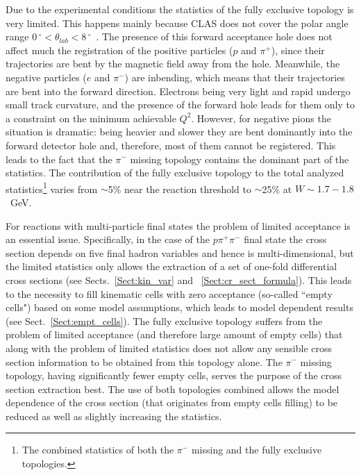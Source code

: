 Due to the experimental conditions the statistics of the fully exclusive topology is very limited. This happens mainly because CLAS does not cover the polar angle range $0\,^{\circ}\mathrm{} < \theta_{lab} < 8\,^{\circ}\mathrm{}$~\cite{Mecking:2003zu}. The presence of this forward acceptance
hole does not affect much the registration of the positive particles ($p$ and $\pi^{+}$), since their trajectories are bent by the magnetic field away from the hole. Meanwhile, the negative particles ($e$ and $\pi^{-}$) are inbending, which means that their trajectories are bent into the forward direction. Electrons being very light and rapid undergo small track curvature, and the presence of the forward hole leads for them only to a constraint on the minimum achievable $Q^2$. However, for negative pions the situation is dramatic: being heavier and slower they are bent dominantly into the forward detector hole and, therefore, most of them cannot be registered. This leads to the fact that the $\pi^{-}$ missing topology contains the dominant part of the statistics. The contribution of the fully exclusive topology to the total analyzed statistics\footnote[7]{The combined statistics of both the $\pi^{-}$ missing and the fully exclusive topologies.} varies from $\sim$5\% near the reaction threshold to $\sim$25\% at $W\sim 1.7-1.8$~GeV. 
 
For reactions with multi-particle final states the problem of limited acceptance is an essential issue. Specifically, in the case of the $p\pi^{+}\pi^{-}$ final state the cross section  depends on five final hadron variables and hence is multi-dimensional, but the limited statistics only allows the extraction of a set of one-fold differential cross sections (see Sects.~\ref{Sect:kin_var} and ~\ref{Sect:cr_sect_formula}). This leads to the necessity to fill kinematic cells with zero acceptance (so-called ``empty cells") based on some model assumptions, which leads to model dependent results (see Sect.~\ref{Sect:empt_cells}). The fully exclusive topology suffers from the problem of limited acceptance (and therefore large amount of empty cells) that along with the problem of limited statistics does not allow any sensible cross section information to be obtained from this topology alone. The $\pi^{-}$ missing topology, having significantly fewer empty cells, serves the purpose of the cross section extraction best. The use of both topologies combined allows the model dependence of the cross section (that originates from empty cells filling) to be reduced as well as slightly increasing the statistics.

